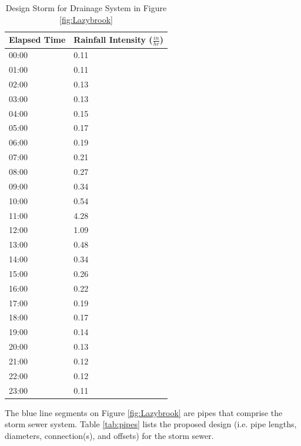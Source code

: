 \documentclass[12pt]{article}
\begin{document}
\begin{enumerate}
\begin{table}[ht!]
      \caption{Design Storm for Drainage System in Figure \ref{fig:Lazybrook} \\}
   \begin{tabular}{| p{1.6in} | p{1.7in} |} %
   \hline
   \hline
Elapsed Time & Rainfall Intensity ($\frac{in}{hr}$) \\
\hline
\hline
00:00 & 0.11 \\
01:00 & 0.11 \\
02:00 & 0.13 \\
03:00 & 0.13 \\
04:00 & 0.15 \\
05:00 & 0.17 \\
06:00 & 0.19 \\
07:00 & 0.21 \\
08:00 & 0.27 \\
09:00 & 0.34 \\
10:00 & 0.54 \\
11:00 & 4.28 \\
12:00 & 1.09 \\
13:00 & 0.48 \\
14:00 & 0.34 \\
15:00 & 0.26 \\
16:00 & 0.22 \\
17:00 & 0.19 \\
18:00 & 0.17 \\
19:00 & 0.14 \\
20:00 & 0.13 \\
21:00 & 0.12 \\
22:00 & 0.12 \\
23:00 & 0.11 \\
\hline
\hline
   \end{tabular}
   \label{tab:storm}
\end{table}

The blue line segments on Figure \ref{fig:Lazybrook} are pipes that comprise the storm sewer system.   Table \ref{tab:pipes} lists the proposed design (i.e. pipe lengths, diameters, connection(s), and offsets) for the storm sewer.

\clearpage


\end{enumerate}
\end{document}
